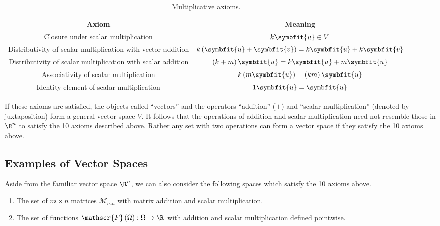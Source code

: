 \documentclass{article}
\begin{document}
\begin{multicols*}{3}
\begin{table}[H]
        \centering
        \begin{tabular}{c c}
            \toprule
            \textbf{Axiom}                                               & \textbf{Meaning}                                                             \\
            \midrule
            Closure under scalar multiplication                          & \(k \symbfit{u} \in V\)                                                      \\
            Distributivity of scalar multiplication with vector addition & \(k \left( \symbfit{u} + \symbfit{v} \right) = k\symbfit{u} + k\symbfit{v}\) \\
            Distributivity of scalar multiplication with scalar addition & \(\left( k + m \right) \symbfit{u} = k\symbfit{u} + m\symbfit{u}\)           \\
            Associativity of scalar multiplication                       & \(k \left( m\symbfit{u} \right) = \left( k m \right) \symbfit{u}\)           \\
            Identity element of scalar multiplication                    & \(1 \symbfit{u} = \symbfit{u}\)                                              \\
            \bottomrule
        \end{tabular}
        \caption{Multiplicative axioms.} %
    \end{table}
    If these axioms are satisfied, the objects called ``vectors'' and the operators ``addition'' (\(+\)) and ``scalar multiplication'' (denoted by juxtaposition) form a general vector space \(V\).
    It follows that the operations of addition and scalar multiplication need not resemble those in \(\R^n\) to satisfy the 10 axioms described above.
    Rather any set with two operations can form a vector space if they satisfy the 10 axioms above.
    \subsection{Examples of Vector Spaces}
    Aside from the familiar vector space \(\R^n\), we can also consider the following spaces which satisfy the 10 axioms above.
    \begin{enumerate}
        \item The set of \(m \times n\) matrices \(\mathscr{M}_{mn}\) with matrix addition and scalar multiplication.
        \item The set of functions \(\mathscr{F}\left( \Omega \right) : \Omega \to \R\) with addition and scalar multiplication defined pointwise.
    \end{enumerate}

\end{multicols*}
\end{document}
